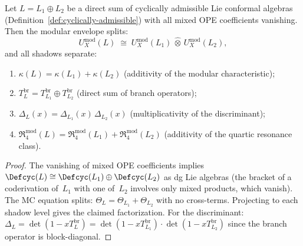 \begin{proposition}
\label{prop:independent-sum-factorization}
\ClaimStatusProvedHere
{}
Let $L = L_1 \oplus L_2$ be a direct sum of cyclically
admissible Lie conformal algebras
(Definition~\textup{\ref{def:cyclically-admissible}})
with all mixed OPE coefficients vanishing.  Then
the modular envelope splits:
\[
U_X^{\mathrm{mod}}(L)
\;\cong\;
U_X^{\mathrm{mod}}(L_1)
\,\widehat\otimes\,
U_X^{\mathrm{mod}}(L_2),
\]
and all shadows separate:
\begin{enumerate}[label=\textup{(\roman*)}]
\item $\kappa(L) = \kappa(L_1) + \kappa(L_2)$
  \textup{(}additivity of the modular
  characteristic\textup{)};
\item $T_L^{\mathrm{br}}
  = T_{L_1}^{\mathrm{br}}
  \oplus T_{L_2}^{\mathrm{br}}$
  \textup{(}direct sum of branch operators\textup{)};
\item $\Delta_L(x)
  = \Delta_{L_1}(x)\,\Delta_{L_2}(x)$
  \textup{(}multiplicativity of the
  discriminant\textup{)};
\item $\mathfrak{R}_4^{\mathrm{mod}}(L)
  = \mathfrak{R}_4^{\mathrm{mod}}(L_1)
  + \mathfrak{R}_4^{\mathrm{mod}}(L_2)$
  \textup{(}additivity of the quartic resonance
  class\textup{)}.
\end{enumerate}
\end{proposition}

\begin{proof}
The vanishing of mixed OPE coefficients implies
$\Defcyc(L)
\cong \Defcyc(L_1) \oplus \Defcyc(L_2)$
as dg Lie algebras (the bracket of a coderivation
of~$L_1$ with one of~$L_2$ involves only mixed products,
which vanish).  The MC equation splits:
$\Theta_L = \Theta_{L_1} + \Theta_{L_2}$ with no
cross-terms.
Projecting to each shadow level gives the claimed
factorization.
For the discriminant:
$\Delta_L = \det(1 - xT_L^{\mathrm{br}})
= \det(1 - xT_{L_1}^{\mathrm{br}}) \cdot
\det(1 - xT_{L_2}^{\mathrm{br}})$
since the branch operator is block-diagonal.
\end{proof}

